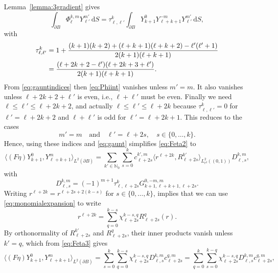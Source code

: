 \documentclass[reqno]{amsart}
\numberwithin{equation}{section}
\numberwithin{figure}{section}
\numberwithin{table}{section}
\theoremstyle{plain}
\theoremstyle{definition}
\theoremstyle{remark}
\newcommand{\inner}[1]{\langle#1\rangle}
\newcommand{\di}{\mathrm{d}}   %
\newcommand{\N}{\mathbb{N}}
\begin{document}
Lemma~\ref{lemma:3gradient} gives
%
\begin{equation} \label{eq:Phiint}
    \int_{\partial B}\Phi_{\ell}^{k,m}Y_{\ell'}^{m'}\,\di S = \tau_{\ell,\ell'}^k\int_{\partial B} Y_{k+1}^{0}Y_{\ell+k+1}^{-m}Y_{\ell'}^{m'}\,\di S,
\end{equation}
%
with
%
\begin{align}
    \tau_{\ell,\ell'}^k &= 1+\frac{(k+1)(k+2)+(\ell+k+1)(\ell+k+2)-\ell'(\ell'+1)}{2(k+1)(\ell+k+1)} \notag \\
    &=\frac{(\ell+2k+2-\ell')(\ell+2k+3+\ell')}{2(k+1)(\ell+k+1)}. \label{eq:tau}
\end{align}
%
From \eqref{eq:gauntindices} then \eqref{eq:Phiint} vanishes unless $m' = m$. It also vanishes unless $\ell+2k+2+\ell'$ is even, i.e., $\ell+\ell'$ must be even. Finally we need $\ell\leq \ell' \leq \ell+2k+2$, and actually $\ell\leq \ell' \leq \ell+2k$ because $\tau_{\ell,\ell'}^k = 0$ for $\ell' = \ell+2k+2$ and $\ell+\ell'$ is odd for $\ell' = \ell+2k+1$. This reduces to the cases
%
\begin{equation*}
    m' = m \quad \text{and} \quad \ell' = \ell+2s, \quad s\in\{0,\dots,k\}.
\end{equation*}
%
Hence, using these indices and \eqref{eq:gaunt} simplifies \eqref{eq:Feta2} to
%
\begin{equation} \label{eq:Feta3}
    \inner{(F\eta)Y_{k+1}^0,Y_{\ell+k+1}^m}_{L^2(\partial B)} = \sum_{k'\in\N_0}\sum_{s=0}^k c_{\ell+2s}^{k',m}\inner{r^{\ell+2k},R_{\ell+2s}^{k'}}_{L^2_{r^2}((0,1))} D_{\ell,s}^{k,m},
\end{equation}
%
with
%
\begin{equation} \label{eq:D}
    D_{\ell,s}^{k,m} = (-1)^{m+1}\tau_{\ell,\ell+2s}^k G_{k+1,\ell+k+1,\ell+2s}^{0,-m,m}.
\end{equation}
%
Writing $r^{\ell+2k} = r^{\ell+2s + 2(k-s)}$ for $s\in\{0,\dots,k\}$, implies that we can use \eqref{eq:monomialexpansion} to write
%
\begin{equation*}
    r^{\ell+2k} = \sum_{q = 0}^{k-s}\chi_{\ell+2s}^{k-s,q} R_{\ell+2s}^{q}(r).
\end{equation*}
%
By orthonormality of $R_{\ell+2s}^{k'}$ and $R_{\ell+2s}^q$, their inner products vanish unless $k' = q$, which from \eqref{eq:Feta3} gives
%
\begin{equation*} 
    \inner{(F\eta)Y_{k+1}^0,Y_{\ell+k+1}^m}_{L^2(\partial B)} = \sum_{s=0}^k\sum_{q = 0}^{k-s}\chi_{\ell+2s}^{k-s,q} D_{\ell,s}^{k,m}c_{\ell+2s}^{q,m} = \sum_{q=0}^k\sum_{s = 0}^{k-q}\chi_{\ell+2s}^{k-s,q} D_{\ell,s}^{k,m}c_{\ell+2s}^{q,m},
\end{equation*} 
\end{document}
